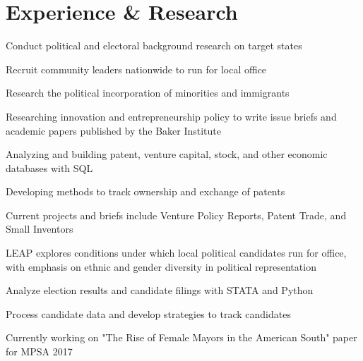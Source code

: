 \documentclass[]{ajk-resume}
\begin{document}
\hfill
\begin{minipage}[t]{0.66\textwidth} 


\section{Experience \& Research}

\vspace{\topsep} %
\begin{tightemize}
\item Conduct political and electoral background research on target states
\item Recruit community leaders nationwide to run for local office
\item Research the political incorporation of minorities and immigrants
\end{tightemize}
\sectionsep

\begin{tightemize}
\item Researching innovation and entrepreneurship policy to write issue briefs and academic papers published by the Baker Institute
\item  Analyzing and building patent, venture capital, stock, and other economic databases with SQL  
\item	Developing methods to track ownership and exchange of patents
\item Current projects and briefs include Venture Policy Reports, Patent Trade, and Small Inventors
\end{tightemize}
\sectionsep

\begin{tightemize}
\item LEAP explores conditions under which local political candidates run for office, with emphasis on ethnic and gender diversity in political representation
\item Analyze election results and candidate filings with STATA and Python
\item Process candidate data and develop strategies to track candidates
\item Currently working on "The Rise of Female Mayors in the American South" paper for MPSA 2017
\end{tightemize}
\sectionsep


\end{minipage}
\end{document}
